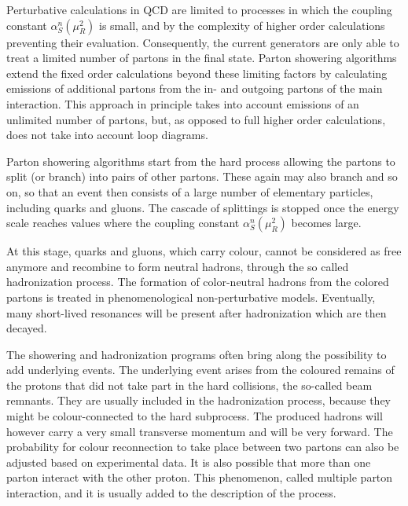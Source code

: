 Perturbative calculations in QCD are limited to processes in which the coupling constant $\alpha_S^n(\mu_R^2)$ is small, and by the complexity of higher order calculations preventing their evaluation.
Consequently, the current generators are only able to treat a limited number of partons in the final state. 
Parton showering algorithms extend the fixed order calculations beyond these limiting factors by calculating emissions of additional partons from the in- and outgoing partons of the main interaction.
This approach in principle takes into account emissions of an unlimited number of partons, but, as opposed to full higher order calculations, does not take into account loop diagrams.

Parton showering algorithms start from the hard process allowing the partons to split (or branch) into pairs of other partons.
These again may also branch and so on, so that an event then consists of a large number of elementary particles, including quarks and gluons.
The cascade of splittings is stopped once the energy scale reaches values where the coupling constant $\alpha_S^n(\mu_R^2)$ becomes large.

At this stage, quarks and gluons, which carry colour, cannot be considered as free anymore and recombine to form neutral hadrons, through the so called hadronization process.
The formation of color-neutral hadrons from the colored partons is treated in phenomenological non-perturbative models.
Eventually, many short-lived resonances will be present after hadronization which are then decayed.

The showering and hadronization programs often bring along the possibility to add underlying events. The underlying event arises from the coloured remains of the protons that did not take part in the hard collisions, the so-called beam remnants.
They are usually included in the hadronization process, because they might be colour-connected to the hard subprocess. The produced hadrons will however carry a very small transverse momentum and will be very forward.
The probability for colour reconnection to take place between two partons can also be adjusted based on experimental data. %
It is also possible that more than one parton interact with the other proton. This phenomenon, called multiple parton interaction, and it is usually added to the description of the process.\\


